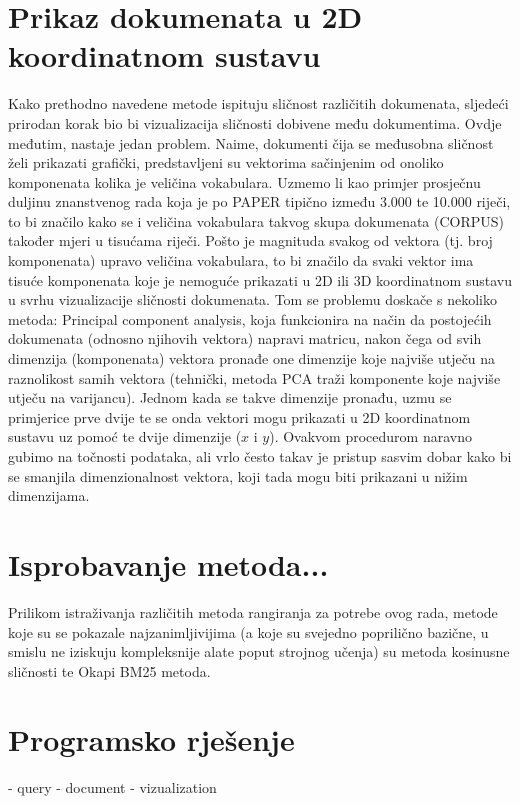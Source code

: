 \documentclass[times, utf8, zavrsni]{fer}
\begin{document}
\chapter{Prikaz dokumenata u 2D koordinatnom sustavu}
Kako prethodno navedene metode ispituju sličnost različitih dokumenata, sljedeći prirodan korak bio bi vizualizacija  sličnosti dobivene među dokumentima. Ovdje međutim, nastaje jedan problem. Naime, dokumenti čija se međusobna sličnost želi prikazati grafički, predstavljeni su vektorima sačinjenim od onoliko komponenata kolika je veličina vokabulara. Uzmemo li kao primjer prosječnu duljinu znanstvenog rada koja je po PAPER tipično između 3.000 te 10.000 riječi, to bi značilo kako se i veličina vokabulara takvog skupa dokumenata (CORPUS) također mjeri u tisućama riječi. Pošto je magnituda svakog od vektora (tj. broj komponenata) upravo veličina vokabulara, to bi značilo da svaki vektor ima tisuće komponenata koje je nemoguće prikazati u 2D ili 3D koordinatnom sustavu u svrhu vizualizacije sličnosti dokumenata. Tom se problemu doskače s nekoliko metoda: Principal component analysis, koja funkcionira na način da postojećih dokumenata (odnosno njihovih vektora) napravi matricu, nakon čega od svih dimenzija (komponenata) vektora pronađe one dimenzije koje najviše utječu na raznolikost samih vektora (tehnički, metoda PCA traži komponente koje najviše utječu na varijancu). Jednom kada se takve dimenzije pronađu, uzmu se primjerice prve dvije te se onda vektori mogu prikazati u 2D koordinatnom sustavu uz pomoć te dvije dimenzije ($x$ i $y$). Ovakvom procedurom naravno gubimo na točnosti podataka, ali vrlo često takav je pristup sasvim dobar kako bi se smanjila dimenzionalnost vektora, koji tada mogu biti prikazani u nižim dimenzijama.

\chapter{Isprobavanje metoda...}
Prilikom istraživanja različitih metoda rangiranja za potrebe ovog rada, metode koje su se pokazale najzanimljivijima (a koje su svejedno poprilično bazične, u smislu ne iziskuju kompleksnije alate poput strojnog učenja) su metoda kosinusne sličnosti te Okapi BM25 metoda.

\chapter{Programsko rješenje}
- query
- document
- vizualization
\end{document}
